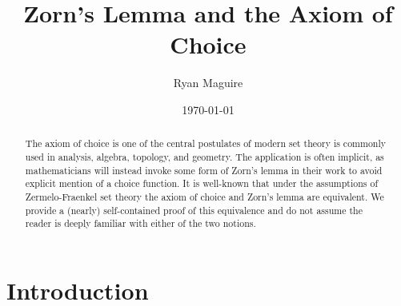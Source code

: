 \documentclass{article}
\title{Zorn's Lemma and the Axiom of Choice}
\author{Ryan Maguire}
\date{\today}
\begin{document}
    \maketitle
    \begin{abstract}
        The axiom of choice is one of the central postulates of modern
        set theory is commonly used in analysis, algebra, topology,
        and geometry. The application is often implicit, as mathematicians
        will instead invoke some form of Zorn's lemma in their work to avoid
        explicit mention of a choice function. It is well-known that under the
        assumptions of Zermelo-Fraenkel set theory the axiom of choice and
        Zorn's lemma are equivalent. We provide a (nearly) self-contained proof
        of this equivalence and do not assume the reader is deeply familiar
        with either of the two notions.
    \end{abstract}
    \section{Introduction}
\end{document}
